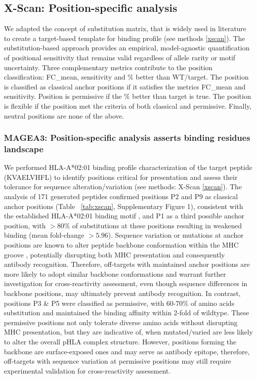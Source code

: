 \documentclass[unnumsec,webpdf,contemporary,large]{oup-authoring-template}%
\theoremstyle{thmstyleone}%
\theoremstyle{thmstyletwo}%
\theoremstyle{thmstylethree}%
\begin{document}
    \subsection{\textbf{X-Scan: Position-specific analysis}}
        We adapted the concept of substitution matrix, that is widely used in literature \cite{reynisson2020netmhcpan, xia2023computational} to create a target-based template for binding profile (see methods \ref{xscan}). 
        The substitution-based approach provides an empirical, model-agnostic quantification of positional sensitivity that remains valid regardless of allele rarity or motif uncertainty. Three complementary metrics contribute to the position classification: FC\_mean, sensitivity and \% better than WT/target. The position is classified as classical anchor positions if it satisfies the metrics FC\_mean and sensitivity. Position is permissive if the \% better than target is true. The position is flexible if the position met the criteria of both classical and permissive. Finally, neutral positions are none of the above.  
        
        \subsubsection{\textbf{MAGEA3: Position-specific analysis asserts binding residues landscape}}
        We performed HLA-A*02:01 binding profile characterization of the target peptide (KVAELVHFL) to identify positions critical for presentation and assess their tolerance for sequence alteration/variation (see methods: X-Scan \ref{xscan}). The analysis of 171 generated peptides confirmed positions P2 and P9 as classical anchor positions (Table ~\ref{tab:xscan}, Supplementary Figure 1), consistent with the established HLA-A*02:01 binding motif \cite{hutchison2018identifying}, and P1 as a third possible anchor position, with $>80\%$ of substitutions at these positions resulting in weakened binding (mean fold-change $>5.96$). Sequence variation or mutations at anchor positions are known to alter peptide backbone conformation within the MHC groove \cite{theodossis2010constraints,cole2010modification}, potentially disrupting both MHC presentation and consequently antibody recognition. Therefore, off-targets with maintained anchor positions are more likely to adopt similar backbone conformations and warrant further investigation for cross-reactivity assessment, even though sequence differences in backbone positions, may ultimately prevent antibody recognition.  
        In contrast, positions P3 \& P5 were classified as permissive, with 60-70\% of amino acids substitution and maintained the binding affinity within 2-fold of wildtype. These permissive positions not only tolerate diverse amino acids without disrupting MHC presentation, but they are indicative of, when mutated/varied are less likely to alter the overall pHLA complex structure. However, positions forming the backbone are surface-exposed ones and may serve as antibody epitope, therefore, off-targets with sequence variation at permissive positions may still require experimental validation for cross-reactivity assessment.  
\end{document}
